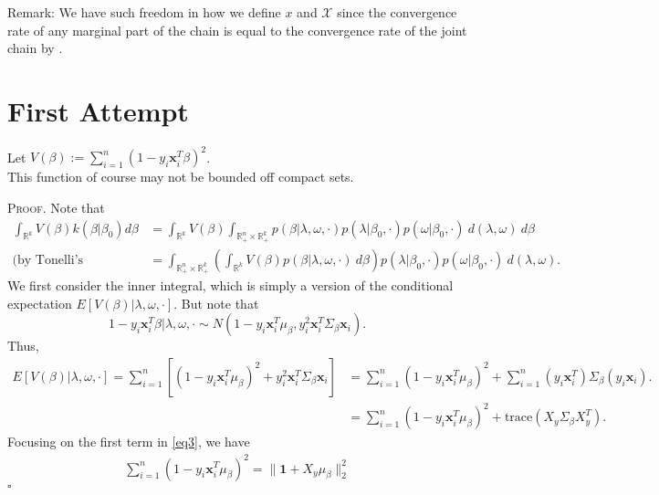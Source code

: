 \documentclass[12pt]{article}
\newcounter{ProofCounter}
\newenvironment{Proof}{\stepcounter{ProofCounter}\textsc{Proof.}}{\hfill$\square$}
\begin{document}
Remark: We have such freedom in how we define $x$ and $\mathcal{X}$ since the convergence rate of any marginal part of the chain is equal to the convergence rate
of the joint chain by \cite{jointvmarg}.

\newpage

\section{First Attempt}

Let $V(\beta) := \sum_{i=1}^{n}(1 - y_i\bm{x}_i^T\beta)^2$. \\

This function of course may not be bounded off compact sets.

\begin{Proof}
  Note that 
  \begin{align}
    \int_{\mathbb{R}^{k}} V(\beta) k(\beta|\beta_0)d\beta & = \int_{\mathbb{R}^{k}}V(\beta) \int_{\mathbb{R}^{n}_+\times \mathbb{R}^{k}_+}
    p(\beta|\lambda,\omega, \cdot)p(\lambda|\beta_0, \cdot)p(\omega|\beta_0, \cdot)\ d(\lambda, \omega)\ d\beta \nonumber \\
    \text{(by Tonelli's Theorem)} \ & = \int_{\mathbb{R}^{n}_+\times\mathbb{R}^{k}_+} \left( \int_{\mathbb{R}^{k}} V(\beta)p(\beta|\lambda, \omega,
    \cdot)\ d\beta \right) p(\lambda|\beta_0,\cdot)p(\omega|\beta_0, \cdot)\ d(\lambda, \omega).
    \label{eq0}
  \end{align}
  We first consider the inner integral, which is simply a version of the conditional expectation $E[V(\beta)|\lambda,\omega,\cdot]$.
  But note that 
  \begin{equation*}
    1 - y_i\bm{x}_i^T\beta | \lambda, \omega, \cdot \sim N\left( 1 - y_i\bm{x}_i^T\mu_{\beta}, y_i^2 \bm{x}_i^T \Sigma_{\beta}\bm{x}_i\right).
    \label{eq2}
  \end{equation*}
  Thus,
  \begin{align}
    E[V(\beta)|\lambda,\omega,\cdot] = \sum_{i=1}^{n}\left[(1 - y_i\bm{x}_i^T\mu_{\beta})^2 + y_i^2 \bm{x}_i^T \Sigma_{\beta} \bm{x}_i\right] & = \sum_{i=1}^{n}
    (1 - y_i\bm{x}_i^T\mu_{\beta})^2 + \sum_{i=1}^{n}(y_i\bm{x}_i^T)\Sigma_{\beta}(y_i \bm{x}_i). \nonumber \\
    & = \sum_{i=1}^{n} (1 - y_i\bm{x}_i^T\mu_{\beta})^2 + \text{trace}(X_{y} \Sigma_{\beta} X_{y}^T).
    \label{eq3}
  \end{align}
  Focusing on the first term in \eqref{eq3}, we have 
  \begin{align}
    \sum_{i=1}^{n}(1 - y_i \bm{x}_i^T \mu_{\beta})^2 = \|\mathbf{1} + X_{y}\mu_{\beta}\|_{2}^{2} 

\end{align}
\end{Proof}
\end{document}
